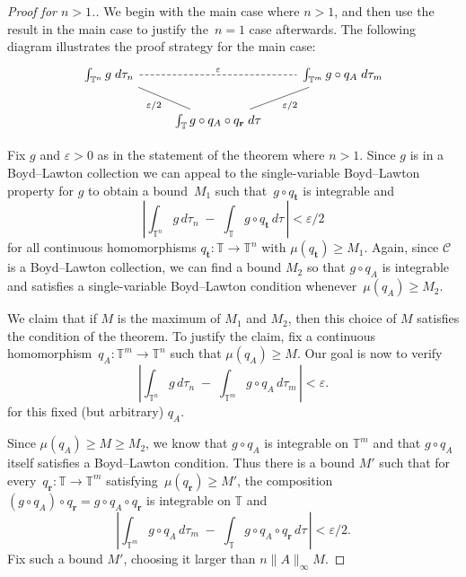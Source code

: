 \documentclass[12pt]{amsart}
\theoremstyle{plain}
\theoremstyle{definition}
\theoremstyle{remark}
\numberwithin{theorem}{section}
\numberwithin{equation}{section} %
\newcommand{\mc}{\mathcal}
\newcommand{\mb}{\mathbf}
\newcommand{\torus}{{\mathbb{T}}}
\begin{document}
\begin{proof}[Proof for $n>1$.]
We begin with the main case where $n>1$, and then use the result in the main case to justify the~$n=1$ case afterwards.
The following diagram illustrates the proof strategy for the main case:
$$
\begin{tikzcd}
\int_{\torus^n} g \; d \tau_n
  \arrow[rr, dash, dashed, "\varepsilon"]  
    \arrow[rd, dash, swap, "\varepsilon/2"] 
&&
\int_{\torus^m} g \circ q_A  \; d \tau_m
 \\
 &
\int_{\torus} g \circ q_A \circ q_{\mb r} \; d \tau
\arrow[ru, dash, swap, "\varepsilon/2"]
 \end{tikzcd}
$$

Fix $g$ and $\varepsilon > 0$ as in the statement of the theorem where $n>1$.
Since $g$ is in a Boyd--Lawton collection we can appeal to the 
single-variable Boyd--Lawton property  for $g$ to obtain a bound~$M_1$ such 
that~$g \circ q_{\mb t}$ is integrable and
\[\left|   \int_{\torus^{n}} g \, d \tau_{n}
 \; - \; 
\int_{\torus} g\circ q_{\mb t} \, d \tau \,
\right|
< \varepsilon/2\]
for all continuous homomorphisms $q_{\mb t} \colon \torus\to \torus^n$ with $\mu\left( q_{\mb t} \right) \ge M_1$.
Again, since $\mc C$ is a Boyd--Lawton collection, we can 
find a bound $M_2$ so that 
$g \circ q_A$ is
integrable and satisfies a single-variable Boyd--Lawton condition whenever~$\mu\left( q_{A} \right) \ge M_2$.

We claim that if $M$ is the maximum of $M_1$ and $M_2$, then this choice of $M$ satisfies the condition of the theorem. 
To justify the claim, fix a continuous homomorphism~$q_A \colon \torus^m \to \torus^n$ such that $\mu\left( q_{A} \right) \ge M$.
Our goal is now to verify
$$
\left|   \int_{\torus^{n}} g \, d \tau_{n}
 \; - \; 
\int_{\torus^m} g \circ q_A \, d \tau_m \,
\right|
< \varepsilon.
$$
for this fixed (but arbitrary) $q_A$.

Since $\mu\left( q_{A} \right) \ge M \ge M_2$, we know that $g \circ q_A$ 
is integrable on $\torus^m$ and that $g \circ q_A$ itself satisfies a Boyd--Lawton condition.
Thus there is a bound $M'$ such that for every~$q_\mb r  \colon \torus \to \torus^m$ satisfying~$\mu\left( q_\mb r \right) \ge M'$, the composition $(g \circ q_A) \circ q_{\mb r} = g \circ q_A \circ q_{\mb r}$ is integrable on $\torus$ and
\[\left|   \int_{\torus^{m}}  g \circ q_A  \, d \tau_{m}
 \; - \; 
\int_{\torus} g \circ q_A \circ q_{\mb r} \, d \tau \,
\right|
< \varepsilon/2.\]
Fix such a bound $M'$, choosing it larger than  $n \| A \|_\infty M$.



\end{proof}
\end{document}
